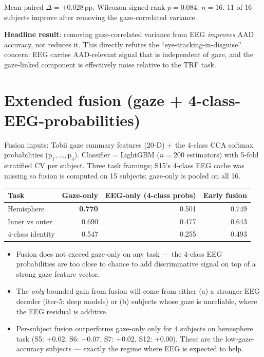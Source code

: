 \noindent
Mean paired $\Delta = +0.028$\,pp. Wilcoxon signed-rank
$p = 0.084$, $n = 16$. 11 of 16 subjects improve after removing the
gaze-correlated variance.

\textbf{Headline result}: removing gaze-correlated variance from EEG
\emph{improves} AAD accuracy, not reduces it. This directly refutes the
``eye-tracking-in-disguise'' concern: EEG carries AAD-relevant signal
that is independent of gaze, and the gaze-linked component is
effectively noise relative to the TRF task.

\section{Extended fusion (gaze + 4-class-EEG-probabilities)}

Fusion inputs: Tobii gaze summary features (20-D) $+$ the 4-class CCA
softmax probabilities ($\text{p}_1, \ldots, \text{p}_4$). Classifier =
LightGBM ($n=200$ estimators) with 5-fold stratified CV per subject.
Three task framings; S15's 4-class EEG cache was missing so fusion is
computed on 15 subjects; gaze-only is pooled on all 16.

\begin{table}[ht]
\centering
\begin{tabular}{lrrr}
\toprule
Task              & Gaze-only & EEG-only (4-class probs) & Early fusion \\
\midrule
Hemisphere    & \textbf{0.770} & 0.501 & 0.749 \\
Inner vs outer & 0.690          & 0.477 & 0.643 \\
4-class identity & 0.547        & 0.255 & 0.493 \\
\bottomrule
\end{tabular}
\end{table}

\begin{itemize}
  \item Fusion does not exceed gaze-only on any task --- the 4-class EEG
        probabilities are too close to chance to add discriminative
        signal on top of a strong gaze feature vector.
  \item The \emph{only} bounded gain from fusion will come from either
        (a) a stronger EEG decoder (iter-5: deep models) or (b) subjects
        whose gaze is unreliable, where the EEG residual is additive.
  \item Per-subject fusion outperforms gaze-only only for 4 subjects
        on hemisphere task (S5: $+0.02$, S6: $+0.07$, S7: $+0.02$, S12:
        $+0.00$). These are the low-gaze-accuracy subjects --- exactly
        the regime where EEG is expected to help.
\end{itemize}

